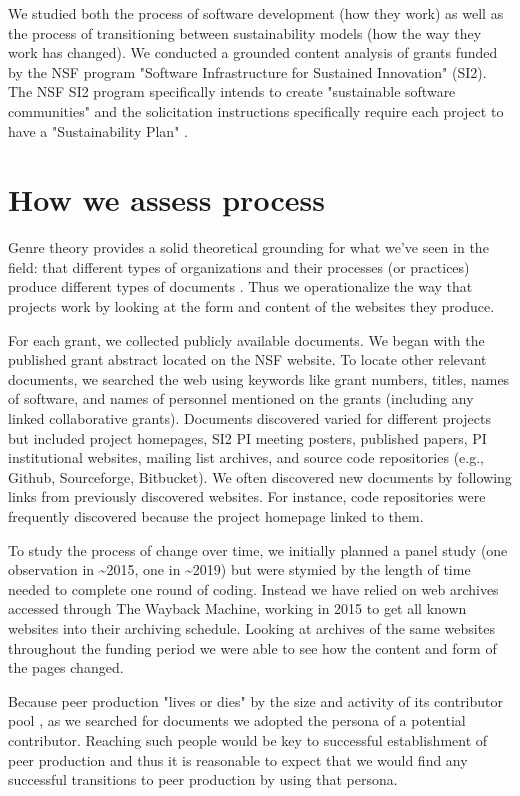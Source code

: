 \documentclass[sigchi-a,screen]{acmart}
\begin{document}
We studied both the process of software development (how they work) as well as the process of transitioning between sustainability models (how the way they work has changed). We conducted a grounded content analysis of grants funded by the NSF program "Software Infrastructure for Sustained Innovation" (SI2). The NSF SI2 program specifically intends to create "sustainable software communities" and the solicitation instructions specifically require each project to have a "Sustainability Plan" \cite{noauthor_software_2016}.

\section{How we assess process}

Genre theory provides a solid theoretical grounding for what we've seen in the field: that different types of organizations and their processes (or practices) produce different types of documents \cite{yates_genres_1992}. Thus we operationalize the way that projects work by looking at the form and content of the websites they produce.

For each grant, we collected publicly available documents. We began with the published grant abstract located on the NSF website. To locate other relevant documents, we searched the web using keywords like grant numbers, titles, names of software, and names of personnel mentioned on the grants (including any linked collaborative grants). Documents discovered varied for different projects but included project homepages, SI2 PI meeting posters, published papers, PI institutional websites, mailing list archives, and source code repositories (e.g., Github, Sourceforge, Bitbucket). We often discovered new documents by following links from previously discovered websites. For instance, code repositories were frequently discovered because the project homepage linked to them. 

To study the process of change over time, we initially planned a panel study (one observation in \textasciitilde2015, one in \textasciitilde2019) but were stymied by the length of time needed to complete one round of coding. Instead we have relied on web archives accessed through The Wayback Machine, working in 2015 to get all known websites into their archiving schedule. Looking at archives of the same websites throughout the funding period we were able to see how the content and form of the pages changed. 

Because peer production "lives or dies" by the size and activity of its contributor pool \cite[page 3]{pierce_patching_2015}, as we searched for documents we adopted the persona of a potential contributor. Reaching such people would be key to successful establishment of peer production and thus it is reasonable to expect that we would find any successful transitions to peer production by using that persona.
\end{document}
